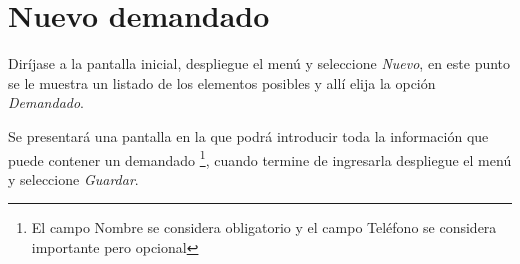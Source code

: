 \section{Nuevo demandado}
\label{sec:nuevoDemandado}
Dir\'ijase a la pantalla inicial, despliegue el men\'u \blackberry y seleccione
\emph{Nuevo}, en este punto se le muestra un listado de los elementos posibles y
all\'i elija la opci\'on \emph{Demandado}.

Se presentar\'a una pantalla en la que podr\'a introducir toda la informaci\'on
que puede contener un demandado
\footnote{El campo Nombre se considera obligatorio y el campo Tel\'efono se
considera importante pero opcional},
cuando termine de ingresarla despliegue el men\'u \blackberry y seleccione
\emph{Guardar}.